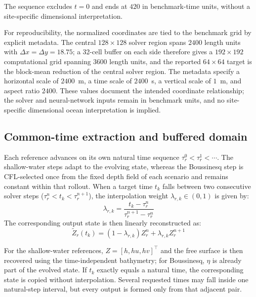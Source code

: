 The sequence excludes $t=0$ and ends at $420$ in benchmark-time units, without a site-specific dimensional interpretation.

For reproducibility, the normalized coordinates are tied to the benchmark grid by explicit metadata. The central $128 \times 128$ solver region spans $2400$ length units with $\Delta x = \Delta y = 18.75$; a 32-cell buffer on each side therefore gives a $192 \times 192$ computational grid spanning $3600$ length units, and the reported $64 \times 64$ target is the block-mean reduction of the central solver region. The metadata specify a horizontal scale of $2400$~m, a time scale of $2400$~s, a vertical scale of $1$~m, and aspect ratio $2400$. These values document the intended coordinate relationship; the solver and neural-network inputs remain in benchmark units, and no site-specific dimensional ocean interpretation is implied.

\subsection{Common-time extraction and buffered domain}
\label{subsec:common-time-extraction}

Each reference advances on its own natural time sequence $\tau_r ^ 0 < \tau_r ^ 1 < \cdots$. The shallow-water steps adapt to the evolving state, whereas the Boussinesq step is CFL-selected once from the fixed depth field of each scenario and remains constant within that rollout.
When a target time $t_k$ falls between two consecutive solver steps ($\tau_r^n < t_k < \tau_r^{n + 1}$), the interpolation weight $\lambda_{r,k} \in (0, 1)$ is given by:
\begin{equation}
\lambda_{r, k} = \frac{t_k - \tau_r ^ n}{\tau_r ^ {n + 1} - \tau_r ^ n}
\end{equation}
The corresponding output state is then linearly reconstructed as:
\begin{equation}
\widetilde{Z}_r(t_k) = (1 - \lambda_{r, k}) Z_r^n + \lambda_{r, k} Z_r^{n+1}
\end{equation}

For the shallow-water references, $Z = [h, hu, hv] ^ \top$ and the free surface is then recovered using the time-independent bathymetry; for Boussinesq, $\eta$ is already part of the evolved state. If $t_k$ exactly equals a natural time, the corresponding state is copied without interpolation. Several requested times may fall inside one natural-step interval, but every output is formed only from that adjacent pair.

